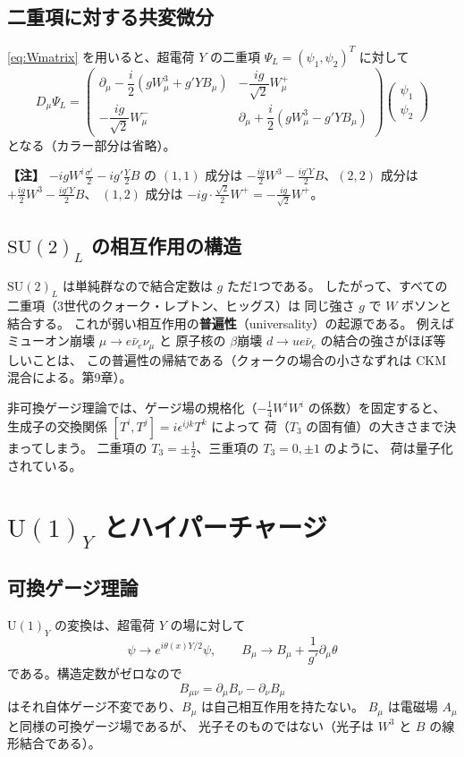 \documentclass[uplatex,dvipdfmx,a4paper,11pt,openany]{jsbook}
\newcommand{\term}[2]{\textbf{#1}（#2）}
\newenvironment{note}{\vspace{1ex}\par\footnotesize\noindent\textbf{【注】}}{\par\vspace{1ex}}
\numberwithin{equation}{chapter}
\theoremstyle{definition}
\theoremstyle{plain}
\theoremstyle{remark}
\newcommand{\SU}{\mathrm{SU}}
\newcommand{\U}{\mathrm{U}}
\begin{document}
\subsection{二重項に対する共変微分}
\eqref{eq:Wmatrix} を用いると、超電荷 $Y$ の二重項 $\Psi_L=(\psi_1,\psi_2)^T$ に対して
\begin{equation}
D_\mu\Psi_L
=\begin{pmatrix}
\partial_\mu-\dfrac{i}{2}\left(gW_\mu^3+g'YB_\mu\right) & -\dfrac{ig}{\sqrt2}W_\mu^+\\[2mm]
-\dfrac{ig}{\sqrt2}W_\mu^- & \partial_\mu+\dfrac{i}{2}\left(gW_\mu^3-g'YB_\mu\right)
\end{pmatrix}
\begin{pmatrix}\psi_1\\ \psi_2\end{pmatrix}
\label{eq:D-doublet}
\end{equation}
となる（カラー部分は省略）。
\begin{note}
$-igW^i\frac{\sigma^i}{2}-ig'\frac Y2B$ の $(1,1)$ 成分は
$-\frac{ig}{2}W^3-\frac{ig'Y}{2}B$、$(2,2)$ 成分は $+\frac{ig}{2}W^3-\frac{ig'Y}{2}B$、
$(1,2)$ 成分は $-ig\cdot\frac{\sqrt2}{2}W^+=-\frac{ig}{\sqrt2}W^+$。
\end{note}
\subsection{$\SU(2)_L$ の相互作用の構造}
$\SU(2)_L$ は単純群なので結合定数は $g$ ただ1つである。
したがって、すべての二重項（3世代のクォーク・レプトン、ヒッグス）は
同じ強さ $g$ で $W$ ボソンと結合する。
これが弱い相互作用の\term{普遍性}{universality}の起源である。
例えばミューオン崩壊 $\mu\to e\bar\nu_e\nu_\mu$ と
原子核の $\beta$崩壊 $d\to ue\bar\nu_e$ の結合の強さがほぼ等しいことは、
この普遍性の帰結である（クォークの場合の小さなずれは CKM 混合による。第9章）。

非可換ゲージ理論では、ゲージ場の規格化（$-\frac14W^iW^i$ の係数）を固定すると、
生成子の交換関係 $[T^i,T^j]=i\epsilon^{ijk}T^k$ によって
荷（$T_3$ の固有値）の大きさまで決まってしまう。
二重項の $T_3=\pm\frac12$、三重項の $T_3=0,\pm1$ のように、
荷は量子化されている。
\section{$\U(1)_Y$ とハイパーチャージ}
\subsection{可換ゲージ理論}
$\U(1)_Y$ の変換は、超電荷 $Y$ の場に対して
\begin{equation}
\psi\longrightarrow e^{i\theta(x)Y/2}\psi,
\qquad
B_\mu\longrightarrow B_\mu+\frac{1}{g'}\partial_\mu\theta
\end{equation}
である。構造定数がゼロなので
\begin{equation}
B_{\mu\nu}=\partial_\mu B_\nu-\partial_\nu B_\mu
\end{equation}
はそれ自体ゲージ不変であり、$B_\mu$ は自己相互作用を持たない。
$B_\mu$ は電磁場 $A_\mu$ と同様の可換ゲージ場であるが、
光子そのものではない（光子は $W^3$ と $B$ の線形結合である）。
\end{document}
